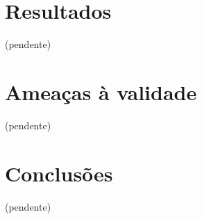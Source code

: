 %
%


\section{Resultados}

(pendente)

\section{Ameaças à validade}

(pendente)

\section{Conclusões}

(pendente)

